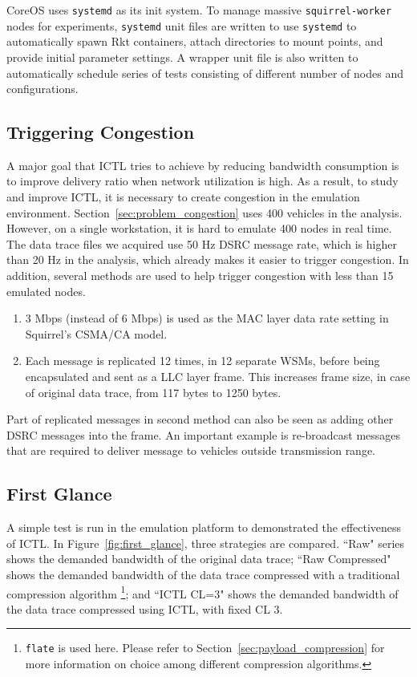 \documentclass[12pt]{report}
\begin{document}
CoreOS uses \texttt{systemd} as its init system. To manage massive \texttt{squirrel-worker} nodes for experiments, \texttt{systemd} unit files are written to use \texttt{systemd} to automatically spawn Rkt containers, attach directories to mount points, and provide initial parameter settings. A wrapper unit file is also written to automatically schedule series of tests consisting of different number of nodes and configurations.

\subsection{Triggering Congestion}
\label{sec:trigger_congestion}

A major goal that ICTL tries to achieve by reducing bandwidth consumption is to improve delivery ratio when network utilization is high. As a result, to study and improve ICTL, it is necessary to create congestion in the emulation environment. Section~\ref{sec:problem_congestion} uses 400 vehicles in the analysis. However, on a single workstation, it is hard to emulate 400 nodes in real time. The data trace files we acquired use 50 Hz DSRC message rate, which is higher than 20 Hz in the analysis, which already makes it easier to trigger congestion. In addition, several methods are used to help trigger congestion with less than 15 emulated nodes.

\begin{enumerate}
  \item 3 Mbps (instead of 6 Mbps) is used as the MAC layer data rate setting in Squirrel's CSMA/CA model.
  \item Each message is replicated 12 times, in 12 separate WSMs, before being encapsulated and sent as a LLC layer frame. This increases frame size, in case of original data trace, from 117 bytes to 1250 bytes.
\end{enumerate}

Part of replicated messages in second method can also be seen as adding other DSRC messages into the frame. An important example is re-broadcast messages that are required to deliver message to vehicles outside transmission range.


\subsection{First Glance}

A simple test is run in the emulation platform to demonstrated the effectiveness of ICTL. In Figure~\ref{fig:first_glance}, three strategies are compared. ``Raw" series shows the demanded bandwidth of the original data trace; ``Raw Compressed" shows the demanded bandwidth of the data trace compressed with a traditional compression algorithm \footnote{\texttt{flate} is used here. Please refer to Section~\ref{sec:payload_compression} for more information on choice among different compression algorithms.}; and ``ICTL CL=3" shows the demanded bandwidth of the data trace compressed using ICTL, with fixed CL 3.
\end{document}

